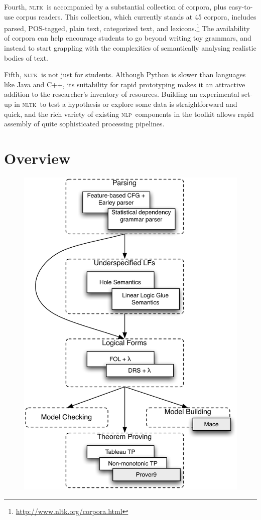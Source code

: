 \documentclass[11pt, a4paper]{article}
\newcommand{\NLP}{\textsc{nlp}}
\newcommand{\NLTK}{\textsc{nltk}}
\begin{document}
Fourth, \NLTK\ is accompanied by a substantial collection of corpora,
plus easy-to-use corpus readers.  This collection, which currently
stands at 45 corpora, includes parsed, POS-tagged, plain text,
categorized text, and
lexicons.\footnote{\url{http://www.nltk.org/corpora.html}} The
availability of corpora can help encourage students to go beyond
writing toy grammars, and instead to start grappling with the
complexities of semantically analysing realistic bodies of text.

Fifth, \NLTK\ is not just for students. Although Python is slower than
languages like Java and C++, its suitability for rapid prototyping
makes it an attractive addition to the researcher's inventory of
resources. Building an experimental set-up in \NLTK\ to test a
hypothesis or explore some data is straightforward and quick, and the
rich variety of existing \NLP\ components in the toolkit allows rapid
assembly of quite sophisticated processing pipelines.


\section{Overview}
\label{sec:overview}


\begin{figure}
  \centering
\includegraphics[scale=.6]{modules}  
\end{figure}
\end{document}
